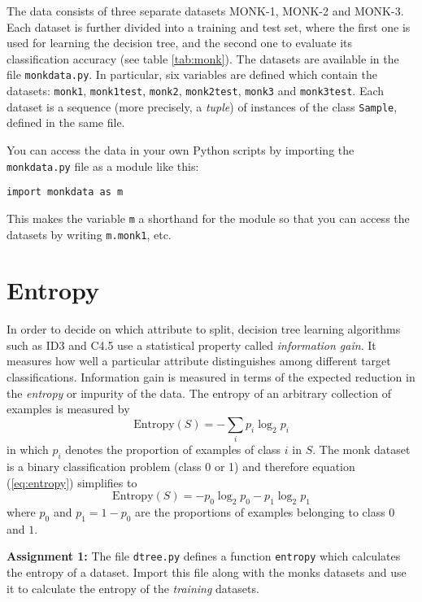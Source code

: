 \documentclass[11pt]{article}
\begin{document}
The data consists of three separate datasets MONK-1, MONK-2 and
MONK-3.  Each dataset is further divided into a training and test set,
where the first one is used for learning the decision tree, and the
second one to evaluate its classification accuracy (see table
\ref{tab:monk}).  The datasets are available in
the file \verb!monkdata.py!.  In particular, six variables are defined
which contain the datasets:
\verb!monk1!, \verb!monk1test!, \verb!monk2!,
\verb!monk2test!, \verb!monk3! and \verb!monk3test!.
Each dataset is a sequence (more precisely, a \emph{tuple}) of instances
of the class \texttt{Sample}, defined in the same file.

You can access the data in your own Python scripts by importing
the \texttt{monkdata.py} file as a module like this:
\begin{verbatim}
import monkdata as m
\end{verbatim}

This makes the variable \texttt{m} a shorthand for the module so that
you can access the datasets by writing \verb!m.monk1!, etc.


\section{Entropy}

In order to decide on which attribute to split, decision tree learning
algorithms such as ID3 and C4.5 use a statistical property called
\emph{information gain}.  It measures how well a particular attribute
distinguishes among different target classifications.  Information
gain is measured in terms of the expected reduction in the
\emph{entropy} or impurity of the data.  The entropy of an arbitrary
collection of examples is measured by
\begin{equation}
\textrm{Entropy}(S) = - \sum_i p_i \log_2 p_i
\label{eq:entropy}
\end{equation}
in which $p_i$ denotes the proportion of examples of class $i$ in $S$. 
The monk dataset is a binary classification problem (class 0 or 1) and
therefore equation (\ref{eq:entropy}) simplifies to
\begin{equation}
\textrm{Entropy}(S) = - p_0 \log_2 p_0 - p_1 \log_2 p_1
\end{equation}
where $p_0$ and $p_1=1-p_0$ are the proportions of examples belonging to class 
$0$ and $1$.\\[2ex]

\begin{tcolorbox}
\textbf{Assignment 1:} The file \verb!dtree.py! defines a function
\texttt{entropy} which calculates the entropy of a dataset.  Import
this file along with the monks datasets and use it to calculate the
entropy of the \emph{training} datasets.
\end{tcolorbox}
\end{document}
